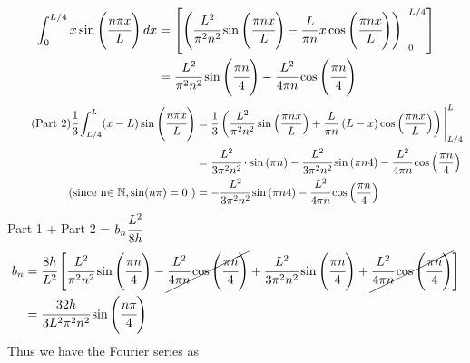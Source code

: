\documentclass[addpoints]{exam}
\begin{document}
\begin{questions}
\begin{solution}
\begin{align*}
        \int^{L/4}_0x\sin\left(\cfrac{n\pi x}{L}\right)dx &=  \left[\left( \cfrac{L^2}{{\pi}^2n^2}\sin\left(\cfrac{{\pi}nx}{L}\right)- \frac{L}{{\pi}n}x
            \cos\left(\cfrac{{\pi}nx}{L}\right)\right)\Bigg|_{0}^{L/4}\right]\\
                                                          & =\cfrac{L^2}{\pi^2 n^2}\sin\left(\cfrac{{\pi}n}{4}\right)-\cfrac{L^2}{4\pi n}\cos\left(\cfrac{\pi n}{4}\right)
    \end{align*}
    \begin{align*}
        \tag{Part 2}
        \cfrac{1}{3}\int^L_{L/4}(x-L)\sin\left(\cfrac{n\pi x}{L}\right) &=\frac{1}{3}\left(\frac{L^2}{\pi^2n^2}\sin\left(\frac{{\pi}nx}{L}\right)+\frac{L}{\pi n}\left(L-x\right)\cos\left(\frac{\pi nx}{L}\right)\right)\Bigg|_{L/4}^{L}\\ 
                                                                       &= \cfrac{L^2}{3{\pi}^2n^2}\cdot\sin\left({\pi}n\right)-\cfrac{L^2}{3{\pi}^2n^2}\sin\left({{\pi}n}{4}\right)-\cfrac{L^2}{{4\pi}n}\cos\left(\frac{{\pi}n}{4}\right)\\
                                                                        \tag{since n$ \in \mathbb{N},\sin(n\pi) = 0$ }
                                                                       & =-\cfrac{L^2}{3{\pi}^2n^2}\sin\left({{\pi}n}{4}\right)-\cfrac{L^2}{{4\pi}n}\cos\left(\frac{{\pi}n}{4}\right)
    \end{align*}
    Part 1 + Part 2 = $b_n\cfrac{L^2}{8h}$
    \begin{align*}
        b_n &=\cfrac{8h}{L^2}\left[\cfrac{L^2}{\pi^2 n^2}\sin\left(\cfrac{{\pi}n}{4}\right)-\cancel{\cfrac{L^2}{4\pi n}\cos\left(\cfrac{\pi n}{4}\right)}+\cfrac{L^2}{3{\pi}^2n^2}\sin\left(\cfrac{{\pi}n}{4}\right)+\cancel{\cfrac{L^2}{{4\pi}n}\cos\left(\cfrac{{\pi}n}{4}\right)}\right]\\
            &=\cfrac{32h}{3L^2\pi^2n^2}\sin\left(\cfrac{n\pi}{4}\right) 
    \end{align*}
    Thus we have the Fourier series as 


\end{solution}
\end{questions}
\end{document}
